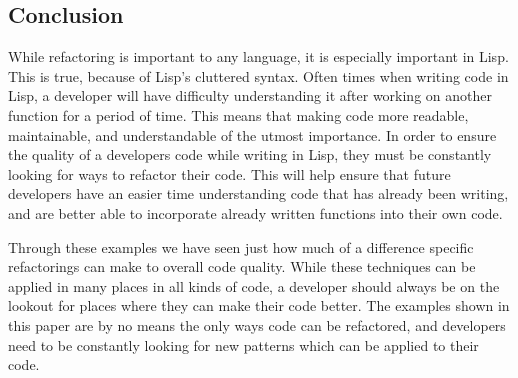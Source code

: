 \subsection{Conclusion}
 
While refactoring is important to any language, it is especially important in Lisp. This is true, because of Lisp’s cluttered syntax. Often times when writing code in Lisp, a developer will have difficulty understanding it after working on another function for a period of time. This means that making code more readable, maintainable, and understandable of the utmost importance. In order to ensure the quality of a developers code while writing in Lisp, they must be constantly looking for ways to refactor their code. This will help ensure that future developers have an easier time understanding code that has already been writing, and are better able to incorporate already written functions into their own code.
 
Through these examples we have seen just how much of a difference specific refactorings can make to overall code quality. While these techniques can be applied in many places in all kinds of code, a developer should always be on the lookout for places where they can make their code better. The examples shown in this paper are by no means the only ways code can be refactored, and developers need to be constantly looking for new patterns which can be applied to their code.
